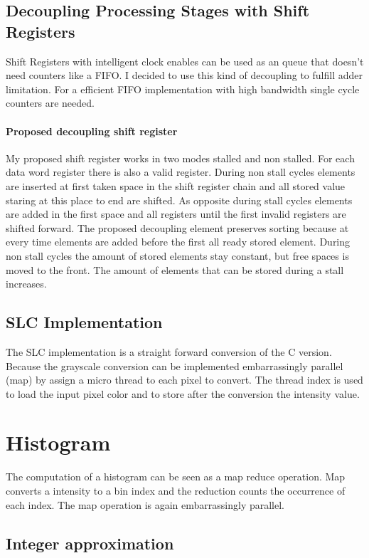 \documentclass[a4paper,fontsize=12pt]{scrartcl}
\begin{document}
\subsection{Decoupling Processing Stages with Shift Registers}

Shift Registers with intelligent clock enables can be used as an queue that doesn't need counters like a FIFO. I decided to use this kind of decoupling to fulfill adder limitation. For a efficient FIFO implementation with high bandwidth single cycle counters are needed.

\paragraph{Proposed decoupling shift register}
My proposed shift register works in two modes stalled and non stalled. For each data word register there is also a valid register. During non stall cycles elements are inserted at first taken space in the shift register chain and all stored value staring at this place to end are shifted. As opposite during stall cycles elements are added in the first space and all registers until the first invalid registers are shifted forward. The proposed decoupling element preserves sorting because at every time elements are added before the first all ready stored element. During non stall cycles the amount of stored elements stay constant, but free spaces is moved to the front. The amount of elements that can be stored during a stall increases.

\subsection{SLC Implementation}
The SLC implementation is a straight forward conversion of the C version. Because the grayscale conversion can be implemented embarrassingly parallel (map) by assign a micro thread to each pixel to convert. The thread index is used to load the input pixel color and to store after the conversion the intensity value.

\section{Histogram}
The computation of a histogram can be seen as a map reduce operation. Map converts a intensity to a bin index and the reduction counts the occurrence of each index. The map operation is again embarrassingly parallel. 

\subsection{Integer approximation}
\end{document}
